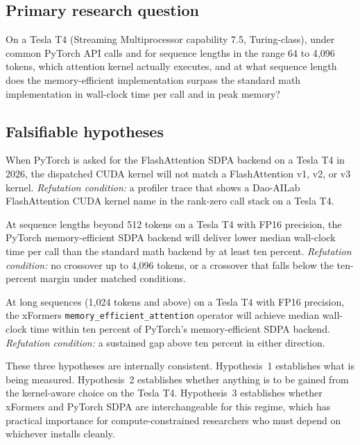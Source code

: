 \documentclass[11pt]{article}
\begin{document}
\subsection{Primary research question}
On a Tesla T4 (Streaming Multiprocessor capability 7.5, Turing-class), under common PyTorch API calls and for sequence lengths in the range 64 to 4{,}096 tokens, which attention kernel actually executes, and at what sequence length does the memory-efficient implementation surpass the standard math implementation in wall-clock time per call and in peak memory?

\subsection{Falsifiable hypotheses}
\begin{description}[leftmargin=2em]
    \item[Hypothesis~1 (kernel attribution).] When PyTorch is asked for the FlashAttention SDPA backend on a Tesla T4 in 2026, the dispatched CUDA kernel will not match a FlashAttention v1, v2, or v3 kernel. \textit{Refutation condition:} a profiler trace that shows a Dao-AILab FlashAttention CUDA kernel name in the rank-zero call stack on a Tesla T4.
    \item[Hypothesis~2 (crossover existence).] At sequence lengths beyond 512 tokens on a Tesla T4 with FP16 precision, the PyTorch memory-efficient SDPA backend will deliver lower median wall-clock time per call than the standard math backend by at least ten percent. \textit{Refutation condition:} no crossover up to 4{,}096 tokens, or a crossover that falls below the ten-percent margin under matched conditions.
    \item[Hypothesis~3 (kernel parity).] At long sequences (1{,}024 tokens and above) on a Tesla T4 with FP16 precision, the xFormers \texttt{memory\_efficient\_attention} operator will achieve median wall-clock time within ten percent of PyTorch's memory-efficient SDPA backend. \textit{Refutation condition:} a sustained gap above ten percent in either direction.
\end{description}
These three hypotheses are internally consistent. Hypothesis~1 establishes what is being measured. Hypothesis~2 establishes whether anything is to be gained from the kernel-aware choice on the Tesla T4. Hypothesis~3 establishes whether xFormers and PyTorch SDPA are interchangeable for this regime, which has practical importance for compute-constrained researchers who must depend on whichever installs cleanly.
\end{document}
